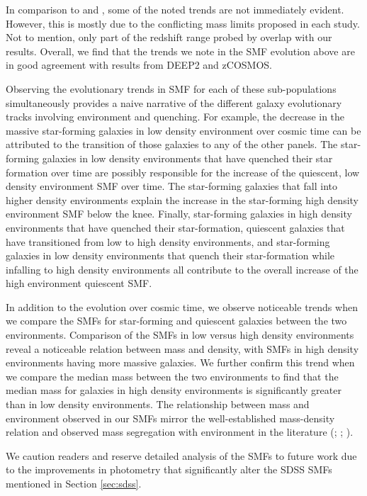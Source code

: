 \documentclass{emulateapj}
\begin{document}
In comparison to \cite{bundy06a} and \cite{Bolzonella:2010aa}, some of the noted trends are not immediately evident. However, this is mostly due to the conflicting mass limits proposed in each study. Not to mention, only part of the redshift range probed by \cite{bundy06a} overlap with our results. Overall, we find that the trends we note in the SMF evolution above are in good agreement with results from DEEP2 and zCOSMOS. 

Observing the evolutionary trends in SMF for each of these sub-populations simultaneously provides a naive narrative of the different galaxy evolutionary tracks involving environment and quenching. For example, the decrease in the massive star-forming galaxies in low density environment over cosmic time can be attributed to the transition of those galaxies to any of the other panels. The star-forming galaxies in low density environments that have quenched their star formation over time are possibly responsible for the increase of the quiescent, low density environment SMF over time. The star-forming galaxies that fall into higher density environments explain the increase in the star-forming high density environment SMF below the knee. Finally, star-forming galaxies in high density environments that have quenched their star-formation, quiescent galaxies that have transitioned from low to high density environments, and star-forming galaxies in low density environments that quench their star-formation while infalling to high density environments all contribute to the overall increase of the high environment quiescent SMF.

In addition to the evolution over cosmic time, we observe noticeable trends when we compare the SMFs for star-forming and quiescent galaxies between the two environments. Comparison of the SMFs in low versus high density environments reveal a noticeable relation between mass and density, with SMFs in high density environments having more massive galaxies. We further confirm this trend when we compare the median mass between the two environments to find that the median mass for galaxies in high density environments is significantly greater than in low density environments. The relationship between mass and environment observed in our SMFs mirror the well-established mass-density relation and observed mass segregation with environment in the literature (\cite{bundy06a}; \cite{Scodeggio:2009aa}; \cite{Bolzonella:2010aa}).

We caution readers and reserve detailed analysis of the SMFs to future work due to the improvements in photometry that significantly alter the SDSS SMFs mentioned in Section \ref{sec:sdss}. 
\end{document}
